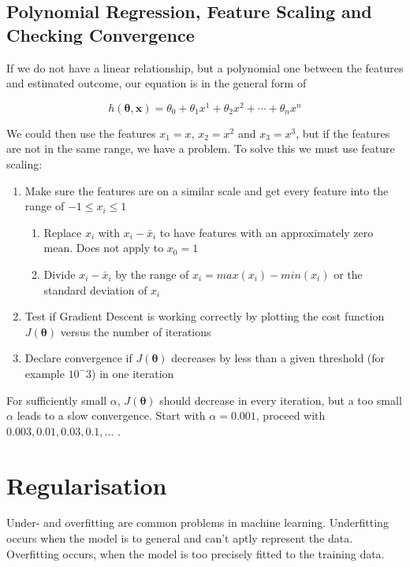 \documentclass[a4paper, 11pt]{article}
\begin{document}
\subsection{Polynomial Regression, Feature Scaling and Checking Convergence}

If we do not have a linear relationship, but a polynomial one between the features and estimated outcome, our equation is in the general form of

\begin{equation}
	h(\bm{\theta},\bm{x}) = \theta_0 + \theta_1 x^1 + \theta_2 x^2 + \cdots + \theta_n x^n
\end{equation}

We could then use the features $x_1 = x$, $x_2 = x^2$ and $x_3 = x^3$, but if the features are not in the same range, we have a problem. To solve this we must use feature scaling:

\begin{enumerate}
	\item Make sure the features are on a similar scale and get every feature into the range of $-1\leq x_i \leq 1$
	\begin{enumerate}
		\item Replace $x_i$ with $x_i - \bar{x}_i$ to have features with an approximately zero mean. Does not apply to $x_0 = 1$
		\item Divide $x_i - \bar{x}_i$ by the range of $x_i = max(x_i) - min(x_i)$ or the standard deviation of $x_i$ 
	\end{enumerate}
	\item Test if Gradient Descent is working correctly by plotting the cost function $J(\bm{\theta})$ versus the number of iterations
	\item Declare convergence if $J(\bm{\theta})$ decreases by less than a given threshold (for example $10^-3$) in one iteration
\end{enumerate}

For sufficiently small $\alpha$, $J(\bm{\theta})$ should decrease in every iteration, but a too small $\alpha$ leads to a slow convergence. Start with $\alpha = 0.001$, proceed with $0.003, 0.01, 0.03, 0.1, ...$ .

\section{Regularisation}
Under- and overfitting are common problems in machine learning. Underfitting occurs when the model is to general and can't aptly represent the data. Overfitting occurs, when the model is too precisely fitted to the training data.
\end{document}
